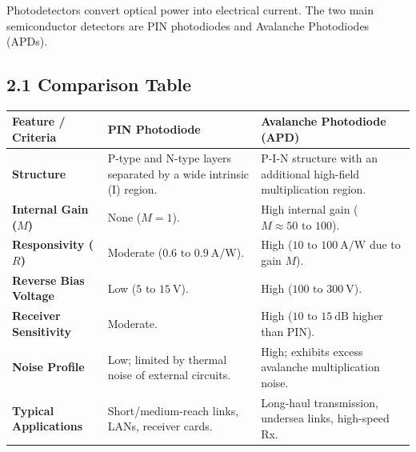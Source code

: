 Photodetectors convert optical power into electrical current. The two main semiconductor detectors are PIN photodiodes and Avalanche Photodiodes (APDs).

\subsection{2.1 Comparison Table}

\begin{table}[H]
\centering
\begin{tabular}{|p{}|p{}|p{}|}
\hline
Feature / Criteria & PIN Photodiode & Avalanche Photodiode (APD) \\
\hline
\textbf{Structure} & P-type and N-type layers separated by a wide intrinsic (I) region. & P-I-N structure with an additional high-field multiplication region. \\
\hline
\textbf{Internal Gain ($M$)} & None ($M = 1$). & High internal gain ($M \approx 50 \text{ to } 100$). \\
\hline
\textbf{Responsivity ($R$)} & Moderate ($0.6 \text{ to } 0.9\ \text{A/W}$). & High ($10 \text{ to } 100\ \text{A/W}$ due to gain $M$). \\
\hline
\textbf{Reverse Bias Voltage} & Low ($5 \text{ to } 15\ \text{V}$). & High ($100 \text{ to } 300\ \text{V}$). \\
\hline
\textbf{Receiver Sensitivity} & Moderate. & High ($10 \text{ to } 15\ \text{dB}$ higher than PIN). \\
\hline
\textbf{Noise Profile} & Low; limited by thermal noise of external circuits. & High; exhibits excess avalanche multiplication noise. \\
\hline
\textbf{Typical Applications} & Short/medium-reach links, LANs, receiver cards. & Long-haul transmission, undersea links, high-speed Rx. \\
\hline
\end{tabular}
\end{table}



